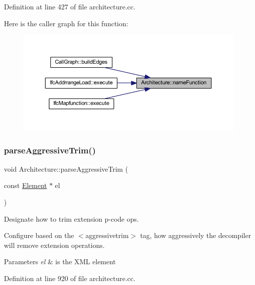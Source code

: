 Definition at line 427 of file architecture.\+cc.

Here is the caller graph for this function\+:
\nopagebreak
\begin{figure}[H]
\begin{center}
\leavevmode
\includegraphics[width=350pt]{class_architecture_a7bd655cd2adbd6538883e1771276604e_icgraph}
\end{center}
\end{figure}
\mbox{\label{class_architecture_a8be334560223db2a9742d8097edf2cf6}} 
\subsubsection{\texorpdfstring{parseAggressiveTrim()}{parseAggressiveTrim()}}
{\footnotesize\ttfamily void Architecture\+::parse\+Aggressive\+Trim (\begin{DoxyParamCaption}\item[{const \mbox{\hyperlink{class_element}{Element}} $\ast$}]{el }\end{DoxyParamCaption})\hspace{0.3cm}{\ttfamily [protected]}}



Designate how to trim extension p-\/code ops. 

Configure based on the $<$aggressivetrim$>$ tag, how aggressively the decompiler will remove extension operations. 
\begin{DoxyParams}{Parameters}
{\em el} & is the X\+ML element \\
\hline
\end{DoxyParams}


Definition at line 920 of file architecture.\+cc.

